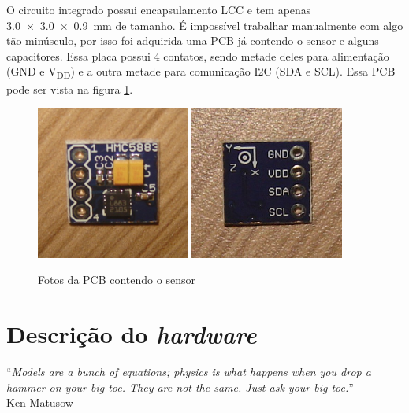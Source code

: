 \documentclass[brazil,pagestart=firstchapter]{abnt}
\newcommand*{\VDD}{V\textsubscript{DD}\xspace}
\newcommand*{\GND}{GND\xspace}
\begin{document}
O circuito integrado possui encapsulamento \ac{LCC} e tem apenas
\SI[product-units=single]{3.0 x 3.0 x 0.9}{\milli\metre} de tamanho. É
impossível trabalhar manualmente com algo tão minúsculo, por isso foi
adquirida uma \ac{PCB} já contendo o sensor e alguns capacitores.
\cite{ebay_HMC5883L} Essa placa possui 4 contatos, sendo metade deles para
alimentação (\GND e \VDD) e a outra metade para comunicação \ac{I2C} (SDA e
SCL). Essa \ac{PCB} pode ser vista na figura \ref{fig:sensor_photos}.

\begin{figure}[h]
\centering
\includegraphics[width=0.45\textwidth]{img/sensor_front.jpg}
\includegraphics[width=0.45\textwidth]{img/sensor_back.jpg}
\caption{Fotos da PCB contendo o sensor}
\label{fig:sensor_photos}
\end{figure}


\chapter{Descrição do \textit{hardware}}
\label{cap:hardware}


\vfill{}
\begin{flushright}{}
``\emph{Models are a bunch of equations; physics is what happens when you
drop a hammer on your big toe. They are not the same. Just ask your big
toe.}''\\
{\small Ken Matusow}
\end{flushright}{\small \par}
\vfill{}
\end{document}
